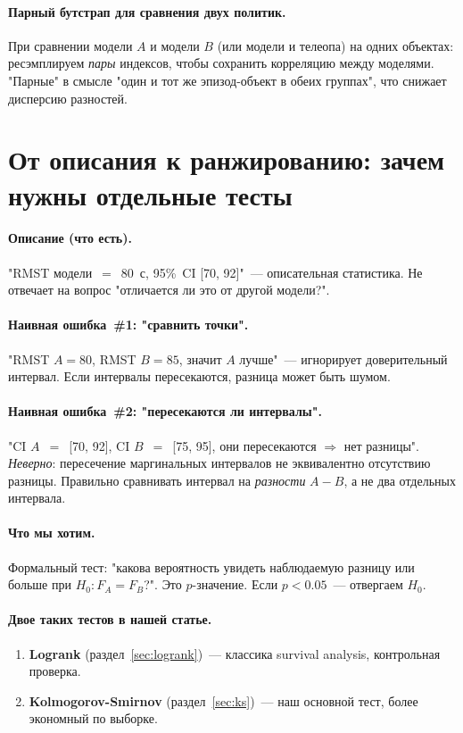 \documentclass[11pt]{article}
\begin{document}
\paragraph{Парный бутстрап для сравнения двух политик.} При сравнении модели $A$ и модели $B$ (или модели и телеопа) на одних объектах: ресэмплируем \emph{пары} индексов, чтобы сохранить корреляцию между моделями. "Парные" в смысле "один и тот же эпизод-объект в обеих группах", что снижает дисперсию разностей.

\section{От описания к ранжированию: зачем нужны отдельные тесты}

\paragraph{Описание (что есть).} "RMST модели~$=$~80~с, 95\%~CI [70, 92]"~--- описательная статистика. Не отвечает на вопрос "отличается ли это от другой модели?".

\paragraph{Наивная ошибка~\#1: "сравнить точки".} "RMST $A=80$, RMST $B=85$, значит $A$ лучше"~--- игнорирует доверительный интервал. Если интервалы пересекаются, разница может быть шумом.

\paragraph{Наивная ошибка~\#2: "пересекаются ли интервалы".} "CI $A$~$=$~[70, 92], CI $B$~$=$~[75, 95], они пересекаются $\Rightarrow$ нет разницы". \emph{Неверно}: пересечение маргинальных интервалов не эквивалентно отсутствию разницы. Правильно сравнивать интервал на \emph{разности} $A - B$, а не два отдельных интервала.

\paragraph{Что мы хотим.} Формальный тест: "какова вероятность увидеть наблюдаемую разницу или больше при $H_0: F_A = F_B$?". Это $p$-значение. Если $p < 0.05$~--- отвергаем $H_0$.

\paragraph{Двое таких тестов в нашей статье.}
\begin{enumerate}[leftmargin=2em, itemsep=1pt]
\item \textbf{Logrank} (раздел~\ref{sec:logrank})~--- классика survival analysis, контрольная проверка.
\item \textbf{Kolmogorov-Smirnov} (раздел~\ref{sec:ks})~--- наш основной тест, более экономный по выборке.
\end{enumerate}
\end{document}

